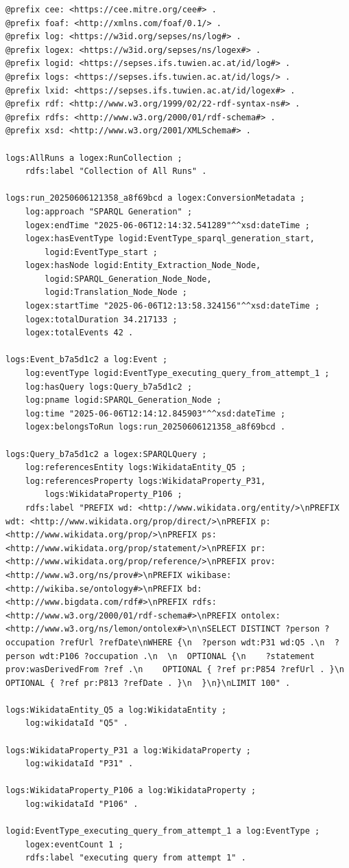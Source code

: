 \begin{lstlisting}[breaklines=true,language=turtle, caption=Example TTL representation of execution logs, label=code:ttl-example]
@prefix cee: <https://cee.mitre.org/cee#> .
@prefix foaf: <http://xmlns.com/foaf/0.1/> .
@prefix log: <https://w3id.org/sepses/ns/log#> .
@prefix logex: <https://w3id.org/sepses/ns/logex#> .
@prefix logid: <https://sepses.ifs.tuwien.ac.at/id/log#> .
@prefix logs: <https://sepses.ifs.tuwien.ac.at/id/logs/> .
@prefix lxid: <https://sepses.ifs.tuwien.ac.at/id/logex#> .
@prefix rdf: <http://www.w3.org/1999/02/22-rdf-syntax-ns#> .
@prefix rdfs: <http://www.w3.org/2000/01/rdf-schema#> .
@prefix xsd: <http://www.w3.org/2001/XMLSchema#> .

logs:AllRuns a logex:RunCollection ;
    rdfs:label "Collection of All Runs" .

logs:run_20250606121358_a8f69bcd a logex:ConversionMetadata ;
    log:approach "SPARQL Generation" ;
    logex:endTime "2025-06-06T12:14:32.541289"^^xsd:dateTime ;
    logex:hasEventType logid:EventType_sparql_generation_start,
        logid:EventType_start ;
    logex:hasNode logid:Entity_Extraction_Node_Node,
        logid:SPARQL_Generation_Node_Node,
        logid:Translation_Node_Node ;
    logex:startTime "2025-06-06T12:13:58.324156"^^xsd:dateTime ;
    logex:totalDuration 34.217133 ;
    logex:totalEvents 42 .

logs:Event_b7a5d1c2 a log:Event ;
    log:eventType logid:EventType_executing_query_from_attempt_1 ;
    log:hasQuery logs:Query_b7a5d1c2 ;
    log:pname logid:SPARQL_Generation_Node ;
    log:time "2025-06-06T12:14:12.845903"^^xsd:dateTime ;
    logex:belongsToRun logs:run_20250606121358_a8f69bcd .

logs:Query_b7a5d1c2 a logex:SPARQLQuery ;
    log:referencesEntity logs:WikidataEntity_Q5 ;
    log:referencesProperty logs:WikidataProperty_P31,
        logs:WikidataProperty_P106 ;
    rdfs:label "PREFIX wd: <http://www.wikidata.org/entity/>\nPREFIX wdt: <http://www.wikidata.org/prop/direct/>\nPREFIX p: <http://www.wikidata.org/prop/>\nPREFIX ps: <http://www.wikidata.org/prop/statement/>\nPREFIX pr: <http://www.wikidata.org/prop/reference/>\nPREFIX prov: <http://www.w3.org/ns/prov#>\nPREFIX wikibase: <http://wikiba.se/ontology#>\nPREFIX bd: <http://www.bigdata.com/rdf#>\nPREFIX rdfs: <http://www.w3.org/2000/01/rdf-schema#>\nPREFIX ontolex: <http://www.w3.org/ns/lemon/ontolex#>\n\nSELECT DISTINCT ?person ?occupation ?refUrl ?refDate\nWHERE {\n  ?person wdt:P31 wd:Q5 .\n  ?person wdt:P106 ?occupation .\n  \n  OPTIONAL {\n    ?statement prov:wasDerivedFrom ?ref .\n    OPTIONAL { ?ref pr:P854 ?refUrl . }\n    OPTIONAL { ?ref pr:P813 ?refDate . }\n  }\n}\nLIMIT 100" .

logs:WikidataEntity_Q5 a log:WikidataEntity ;
    log:wikidataId "Q5" .

logs:WikidataProperty_P31 a log:WikidataProperty ;
    log:wikidataId "P31" .

logs:WikidataProperty_P106 a log:WikidataProperty ;
    log:wikidataId "P106" .

logid:EventType_executing_query_from_attempt_1 a log:EventType ;
    logex:eventCount 1 ;
    rdfs:label "executing query from attempt 1" .
\end{lstlisting}

